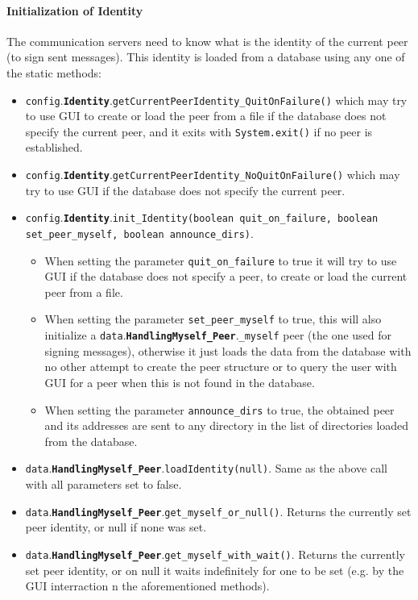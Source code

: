 \documentclass{book}
\newcommand{\pkg}[1]{{\tt #1}}
\newcommand{\cls}[1]{{\tt\bf #1}}
\newcommand{\mth}[1]{{\tt #1}}
\newcommand{\mmb}[1]{{\tt #1}}
\begin{document}
\paragraph{Initialization of Identity}
The communication servers need to know what is the identity of the current peer (to sign sent messages). This identity
is loaded from a database using any one of the static methods:
\begin{itemize}
\item
\pkg{config}.\cls{Identity}.\mth{getCurrentPeerIdentity\_QuitOnFailure()} which may try to use GUI to create or load the peer from a file if the database does not specify
the current peer, and it exits with \mth{System.exit()} if no peer is established.
\item
\pkg{config}.\cls{Identity}.\mth{getCurrentPeerIdentity\_NoQuitOnFailure()} which may try to use GUI if the database does not specify
the current peer.
\item
\pkg{config}.\cls{Identity}.\mth{init\_Identity(boolean quit\_on\_failure, boolean set\_peer\_myself, boolean announce\_dirs)}. 

	\begin{itemize}
	\item
	When setting the parameter \mmb{quit\_on\_failure} to true it will try to use GUI if the database does not specify a peer, to create
	or load the current peer from a file. 
	\item
	When setting the parameter \mmb{set\_peer\_myself} to true, this will also initialize a \pkg{data}.\cls{HandlingMyself\_Peer}.\mmb{\_myself} peer (the one used for signing messages),
	otherwise it just loads the data from the database with no other attempt to create the peer structure or to query the user with GUI for a 		peer
	when this is not found in the database.
	\item
	When setting the parameter \mmb{announce\_dirs} to true, the obtained peer and its addresses are sent to any directory
	in the list of directories loaded from the database.
	\end{itemize}
\item
\pkg{data}.\cls{HandlingMyself\_Peer}.\mth{loadIdentity(null)}. Same as the above call with all parameters set to false.
\item
\pkg{data}.\cls{HandlingMyself\_Peer}.\mth{get\_myself\_or\_null()}. Returns the currently set peer identity, or null if none was set.
\item
\pkg{data}.\cls{HandlingMyself\_Peer}.\mth{get\_myself\_with\_wait()}. Returns the currently set peer identity, or
on null it waits indefinitely for one to be set (e.g. by the GUI interraction n the aforementioned methods).
\end{itemize}
\end{document}
